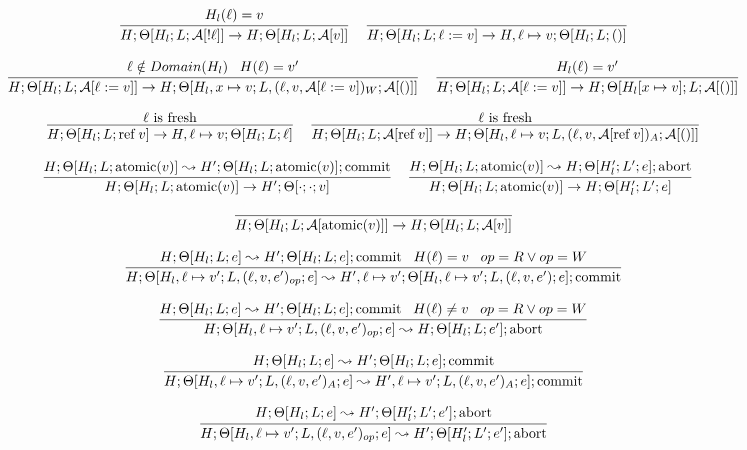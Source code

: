 \documentclass[9pt]{article}
\newcommand{\aeval}[1]{\mathcal{A}[#1]}
\newcommand{\loc}[0]{\ell}
\newcommand{\atomic}[1]{\text{atomic}(#1)}
\newcommand{\alloc}[1]{\text{ref} \; #1}
\newcommand{\commit}[0]{\text{commit}}
\newcommand{\abort}[0]{\text{abort}}
\begin{document}
\[
\infer[]{H; \Theta[H_l; L; \aeval{!\loc}] \rightarrow H; \Theta[H_l; L; \aeval{v}]}{H_l(\loc) = v } \;\;\;
\infer[]{H; \Theta[H_l; L; \loc := v] \rightarrow H, \loc \mapsto v; \Theta[H_l; L; ()]}{}
\]

\[
\infer[]{H; \Theta[H_l; L; \aeval{\loc := v}] \rightarrow H; \Theta[H_l, x\mapsto v; L, (\loc, v, \aeval{\loc := v})_W; \aeval{()}]}{\loc \notin Domain(H_l) \;\;\; H(\loc) = v'} \;\;\;
\infer[]{H; \Theta[H_l; L; \aeval{\loc := v}] \rightarrow H; \Theta[H_l[x\mapsto v]; L; \aeval{()}]}{H_l(\loc) = v'} 
\]

\[
\infer[]{H; \Theta[H_l; L; \alloc{v}] \rightarrow H, \loc \mapsto v; \Theta[H_l; L; \loc]}{\loc \text{ is fresh}} \;\;\;
\infer[]{H; \Theta[H_l; L; \aeval{\alloc{v}}] \rightarrow H; \Theta[H_l, \loc \mapsto v; L, (\loc, v, \aeval{\alloc{v}})_A;  \aeval{()}]}{\loc \text{ is fresh}}
\]

\[
\infer[]{H; \Theta[H_l; L; \atomic{v}] \rightarrow H'; \Theta[\cdot;\cdot; v]}{H; \Theta[H_l; L; \atomic{v}] \leadsto H'; \Theta[H_l; L; \atomic{v}]; \commit} \;\;\;
\infer[]{H; \Theta[H_l; L; \atomic{v}] \rightarrow H; \Theta[H_l'; L'; e]}{H; \Theta[H_l; L; \atomic{v}] \leadsto H; \Theta[H_l'; L'; e]; \abort} \;\;\;
\]

\[
\infer[]{H; \Theta[H_l; L; \aeval{\atomic{v}}] \rightarrow H; \Theta[H_l; L; \aeval{v}]}{}
\]

\boxed{H; \Theta[H_l; L; e] \leadsto H', \Theta[H_l'; L'; e']; (\abort | \commit)}

\[
\infer[]{H; \Theta[H_l, \loc \mapsto v'; L, (\loc,v,e')_{op}; e] \leadsto H', \loc \mapsto v'; \Theta[H_l, \loc \mapsto v'; L, (\loc, v, e');e]; \commit}{H; \Theta[H_l; L; e] \leadsto H'; \Theta[H_l; L; e]; \commit \;\;\; H(\loc) = v \;\;\; op = R \lor op = W}
\]

\[
\infer[]{H; \Theta[H_l, \loc \mapsto v'; L, (\loc,v,e')_{op}; e] \leadsto H; \Theta[H_l; L; e']; \abort}{H; \Theta[H_l; L; e] \leadsto H'; \Theta[H_l; L; e]; \commit \;\;\; H(\loc) \not= v \;\;\; op = R \lor op = W} 
\]

\[
\infer[]{H; \Theta[H_l, \loc \mapsto v'; L, (\loc,v,e')_A; e] \leadsto H', \loc \mapsto v'; L, (\loc,v,e')_A; e]; \commit}{H; \Theta[H_l; L; e] \leadsto H'; \Theta[H_l; L; e]; \commit}
\]

\[
\infer[]{H; \Theta[H_l, \loc \mapsto v'; L, (\loc,v,e')_{op}; e] \leadsto H'; \Theta[H_l'; L'; e']; \abort}{H; \Theta[H_l; L; e] \leadsto H'; \Theta[H_l'; L'; e']; \abort} 
\]
\end{document}
